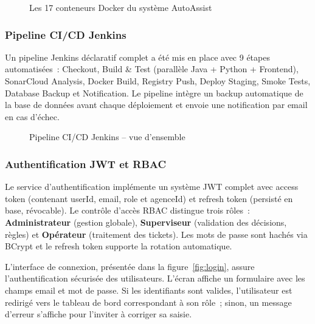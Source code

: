 \begin{figure}[H]
    \centering
    \caption{Les 17 conteneurs Docker du syst\`{e}me AutoAssist}
    \label{fig:docker_ps}
\end{figure}

\subsubsection{Pipeline CI/CD Jenkins}

Un pipeline Jenkins d\'{e}claratif complet a \'{e}t\'{e} mis en place avec 9 \'{e}tapes automatis\'{e}es~: Checkout, Build \& Test (parall\`{e}le Java + Python + Frontend), SonarCloud Analysis, Docker Build, Registry Push, Deploy Staging, Smoke Tests, Database Backup et Notification. Le pipeline int\`{e}gre un backup automatique de la base de donn\'{e}es avant chaque d\'{e}ploiement et envoie une notification par email en cas d'\'{e}chec.

\begin{figure}[H]
    \centering
    \caption{Pipeline CI/CD Jenkins -- vue d'ensemble}
    \label{fig:jenkins}
\end{figure}

\subsubsection{Authentification JWT et RBAC}

Le service d'authentification impl\'{e}mente un syst\`{e}me JWT complet avec access token (contenant userId, email, role et agenceId) et refresh token (persist\'{e} en base, r\'{e}vocable). Le contr\^{o}le d'acc\`{e}s RBAC distingue trois r\^{o}les~: \textbf{Administrateur} (gestion globale), \textbf{Superviseur} (validation des d\'{e}cisions, r\`{e}gles) et \textbf{Op\'{e}rateur} (traitement des tickets). Les mots de passe sont hach\'{e}s via BCrypt et le refresh token supporte la rotation automatique.

L'interface de connexion, pr\'{e}sent\'{e}e dans la figure~\ref{fig:login}, assure l'authentification s\'{e}curis\'{e}e des utilisateurs. L'\'{e}cran affiche un formulaire avec les champs email et mot de passe. Si les identifiants sont valides, l'utilisateur est redirig\'{e} vers le tableau de bord correspondant \`{a} son r\^{o}le~; sinon, un message d'erreur s'affiche pour l'inviter \`{a} corriger sa saisie.

